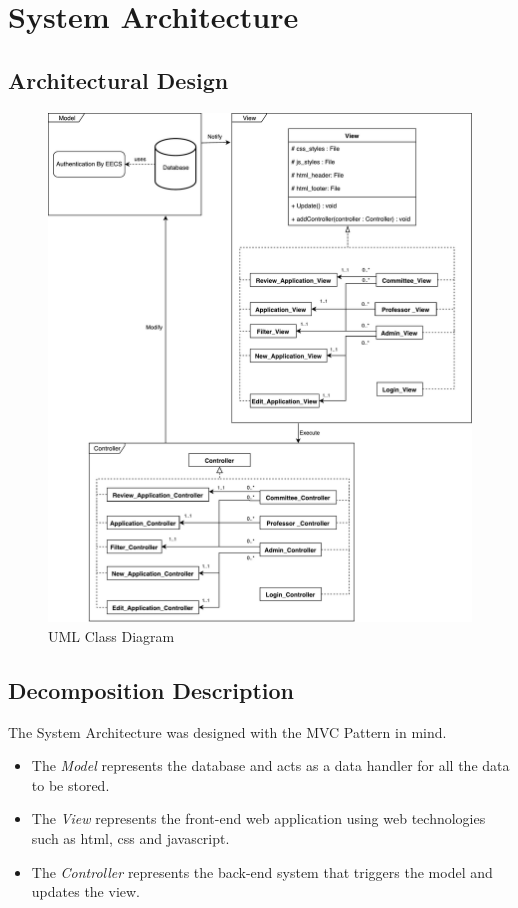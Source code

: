 \documentclass[fontsize=12pt,paper=letter,twoside]{scrartcl}
\begin{document}

\newpage

\section{System Architecture} \label{sec:system_architecture}
\subsection{Architectural Design}
\begin{figure}[!htb]
\begin{center}
\includegraphics[width=.85\textwidth]{images/class_diagram.pdf}
\end{center}
\caption{UML Class Diagram}
\label{fig:uml_class_diagram}
\end{figure}

\newpage
\subsection{Decomposition Description}

The System Architecture was designed with the MVC Pattern in mind.

\begin{itemize}
\item The \emph{Model} represents the database and acts as a data handler for all the data to be stored.

\item The \emph{View} represents the front-end web application using web technologies such as html, css and javascript. 

\item The \emph{Controller} represents the back-end system that triggers the model and updates the view.
\end{itemize}
\end{document}

